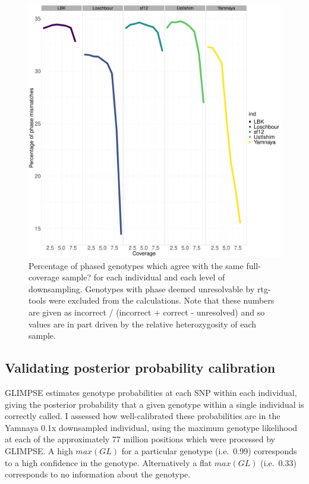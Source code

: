 \begin{figure}[htp]
    \centering
    \includegraphics[width=1.0\textwidth]{../images/chapter1/phasing_performance_downsampled.pdf}
    \caption{Percentage of phased genotypes which agree with the same full-coverage sample? for each individual and each level of downsampling. Genotypes with phase deemed unresolvable by rtg-tools were excluded from the calculations. Note that these numbers are given as incorrect / (incorrect + correct - unresolved) and so values are in part driven by the relative heterozygosity of each sample.}
    \label{fig:phasing_performance_downsampled}
\end{figure}

\subsection{Validating posterior probability calibration}

GLIMPSE estimates genotype probabilities at each SNP within each individual, giving the posterior probability that a given genotype within a single individual is correctly called. I assessed how well-calibrated these probabilities are in the Yamnaya 0.1x downsampled individual, using the maximum genotype likelihood at each of the approximately 77 million positions which were processed by GLIMPSE. A high $max(GL)$ for a particular genotype (i.e.\ 0.99) corresponds to a high confidence in the genotype. Alternatively a flat $max(GL)$ (i.e.\ 0.33) corresponds to no information about the genotype. 

